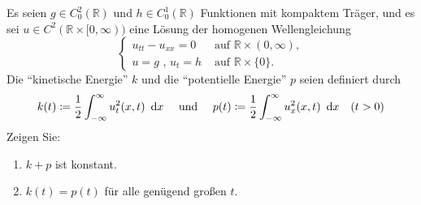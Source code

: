 \begin{exercisePage}
	\setcounter{taskcount}{24}
	\begin{task}
		Es seien $g\in C^2_0(\mathbb R)$ und $h \in C_0^1(\mathbb{R})$ Funktionen mit kompaktem Träger, und es sei $u \in C^2(\mathbb{R}\times [0,\infty))$ eine Lösung der homogenen Wellengleichung
		\begin{equation*}
		\begin{cases}
		u_{tt}-u_{xx} = 0  &\text{ auf } \mathbb{R} \times (0,\infty),
		\\
		u = g \mbox{ , } u_t = h &\text{ auf } \mathbb{R} \times \{0\}.
		\end{cases}
		\end{equation*}
		Die \enquote{kinetische Energie} $k$ und die \enquote{potentielle Energie} $p$ seien definiert durch
		\begin{equation*}
			k(t) \coloneqq \frac12 \int_{-\infty}^\infty u_t^2(x,t) \enskip \mathrm{d}x
			\quad \text{ und } \quad 
			p(t) \coloneqq \frac12 \int_{-\infty}^\infty u_x^2(x,t)\enskip \mathrm{d}x\quad (t>0)
		\end{equation*}
		Zeigen Sie:
		\begin{enumerate}
			\item $k + p$ ist konstant.
			\item $k(t) = p(t)$ für alle genügend großen $t$.
		\end{enumerate}
	\end{task}


\end{exercisePage}
